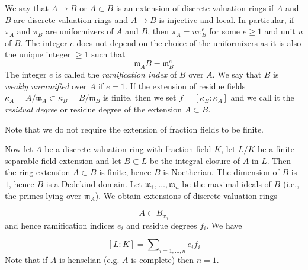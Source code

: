\begin{definition}[\stackstag{09E4}]\label{definition:weakly_unramified_and_tamely_ramified_DVR}
    We say that $A \to B$ or $A \subset B$ is an extension of discrete valuation rings if $A$ and $B$ are discrete valuation rings and $A \to B$ is injective and local. In particular, if $\pi _ A$ and $\pi _ B$ are uniformizers of $A$ and $B$, then $\pi _ A = u \pi _ B^ e$ for some $e \geq 1$ and unit $u$ of $B$. The integer $e$ does not depend on the choice of the uniformizers as it is also the unique integer $\geq 1$ such that
\[ \mathfrak m_ A B = \mathfrak m_ B^ e \]
The integer $e$ is called the \textit{ramification index} of $B$ over $A$. We say that $B$ is \textit{weakly unramified} over $A$ if $e = 1$. 
If the extension of residue fields $\kappa _ A = A/\mathfrak m_ A \subset \kappa _ B = B/\mathfrak m_ B$ is finite, 
then we set $f = [\kappa _ B : \kappa _ A]$ and we call it the \textit{residual degree} or residue degree of the extension $A \subset B$.

Note that we do not require the extension of fraction fields to be finite.
\end{definition}

Now let $A$ be a discrete valuation ring with fraction field $K$, let  $L/K$ be a finite separable field extension and 
let $B \subset L$ be the integral closure of $A$ in $L$.
Then the ring extension $A \subset B$ is finite, hence $B$ is Noetherian. 
The dimension of $B$ is $1$, hence $B$ is a Dedekind domain.
Let $\mathfrak m_1, \ldots , \mathfrak m_ n$ be the maximal ideals of $B$ (i.e., the primes lying over $\mathfrak m_ A$). 
We obtain extensions of discrete valuation rings

\[ A \subset B_{\mathfrak m_ i} \]
and hence ramification indices $e_ i$ and residue degrees $f_ i$. We have

\[ [L : K] = \sum \nolimits _{i = 1, \ldots , n} e_ i f_ i \]
Note that if $A$ is henselian (e.g. $A$ is complete) then $n=1$. 

